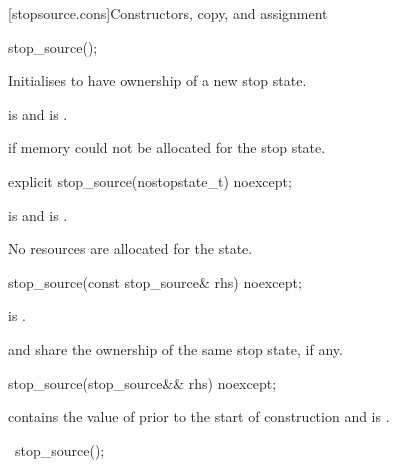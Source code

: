 [stopsource.cons]{Constructors, copy, and assignment}

%
\begin{itemdecl}
stop_source();
\end{itemdecl}

\begin{itemdescr}
\pnum
\effects
Initialises  to have ownership of a new stop state.

\pnum
\ensures
{} is 
and  is .

\pnum
\throws
{} if memory could not be allocated for the stop state.
\end{itemdescr}

%
\begin{itemdecl}
explicit stop_source(nostopstate_t) noexcept;
\end{itemdecl}

\begin{itemdescr}
\pnum
\ensures
{} is  and
 is .
\begin{note}
No resources are allocated for the state.
\end{note}
\end{itemdescr}

%
\begin{itemdecl}
stop_source(const stop_source& rhs) noexcept;
\end{itemdecl}

\begin{itemdescr}
\pnum
\ensures
{} is .
\begin{note}
 and  share the ownership of the same stop state,
if any.
\end{note}
\end{itemdescr}

%
\begin{itemdecl}
stop_source(stop_source&& rhs) noexcept;
\end{itemdecl}

\begin{itemdescr}
\pnum
\ensures
{} contains the value of 
prior to the start of construction
and  is .
\end{itemdescr}

%
\begin{itemdecl}
~stop_source();
\end{itemdecl}

